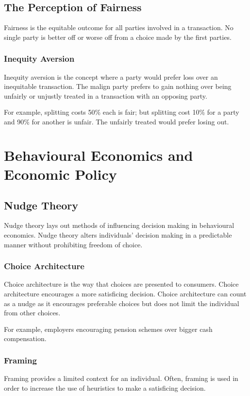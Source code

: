 \documentclass[a4paper,10pt]{article}
\begin{document}
\begin{multicols*}{2}
	\subsection{The Perception of Fairness}
	Fairness is the equitable outcome for all parties involved in a transaction. No single party is better off or worse off from a choice made by the first parties.

	\subsubsection{Inequity Aversion}
	Inequity aversion is the concept where a party would prefer loss over an inequitable transaction. The malign party prefers to gain nothing over being unfairly or unjustly treated in a transaction with an opposing party.
	\medskip

	For example, splitting costs 50\% each is fair; but splitting cost 10\% for a party and 90\% for another is unfair. The unfairly treated would prefer losing out.

	\section{Behavioural Economics and Economic Policy}
	\subsection{Nudge Theory}
	Nudge theory lays out methods of influencing decision making in behavioural economics. Nudge theory alters individuals' decision making in a predictable manner without prohibiting freedom of choice.

	\subsubsection{Choice Architecture}
	Choice architecture is the way that choices are presented to consumers. Choice architecture encourages a more satisficing decision. Choice architecture can count as a nudge as it encourages preferable choices but does not limit the individual from other choices.
	\medskip

	For example, employers encouraging pension schemes over bigger cash compensation.

	\subsubsection{Framing}
	Framing provides a limited context for an individual. Often, framing is used in order to increase the use of heuristics to make a satisficing decision.
	\medskip


\end{multicols*}
\end{document}
